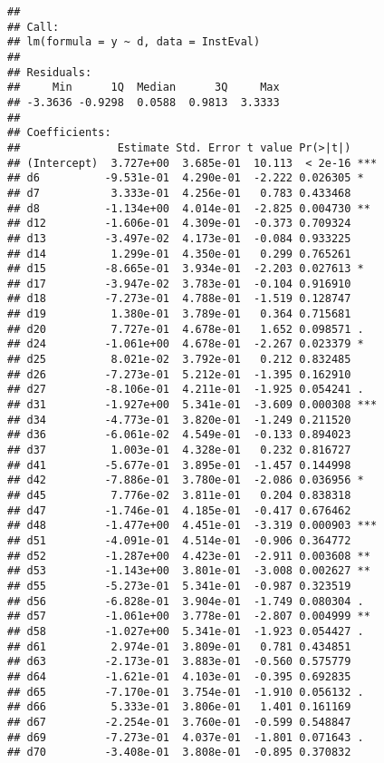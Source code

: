 \documentclass[
]{article}
\begin{document}
\begin{verbatim}
## 
## Call:
## lm(formula = y ~ d, data = InstEval)
## 
## Residuals:
##     Min      1Q  Median      3Q     Max 
## -3.3636 -0.9298  0.0588  0.9813  3.3333 
## 
## Coefficients:
##               Estimate Std. Error t value Pr(>|t|)    
## (Intercept)  3.727e+00  3.685e-01  10.113  < 2e-16 ***
## d6          -9.531e-01  4.290e-01  -2.222 0.026305 *  
## d7           3.333e-01  4.256e-01   0.783 0.433468    
## d8          -1.134e+00  4.014e-01  -2.825 0.004730 ** 
## d12         -1.606e-01  4.309e-01  -0.373 0.709324    
## d13         -3.497e-02  4.173e-01  -0.084 0.933225    
## d14          1.299e-01  4.350e-01   0.299 0.765261    
## d15         -8.665e-01  3.934e-01  -2.203 0.027613 *  
## d17         -3.947e-02  3.783e-01  -0.104 0.916910    
## d18         -7.273e-01  4.788e-01  -1.519 0.128747    
## d19          1.380e-01  3.789e-01   0.364 0.715681    
## d20          7.727e-01  4.678e-01   1.652 0.098571 .  
## d24         -1.061e+00  4.678e-01  -2.267 0.023379 *  
## d25          8.021e-02  3.792e-01   0.212 0.832485    
## d26         -7.273e-01  5.212e-01  -1.395 0.162910    
## d27         -8.106e-01  4.211e-01  -1.925 0.054241 .  
## d31         -1.927e+00  5.341e-01  -3.609 0.000308 ***
## d34         -4.773e-01  3.820e-01  -1.249 0.211520    
## d36         -6.061e-02  4.549e-01  -0.133 0.894023    
## d37          1.003e-01  4.328e-01   0.232 0.816727    
## d41         -5.677e-01  3.895e-01  -1.457 0.144998    
## d42         -7.886e-01  3.780e-01  -2.086 0.036956 *  
## d45          7.776e-02  3.811e-01   0.204 0.838318    
## d47         -1.746e-01  4.185e-01  -0.417 0.676462    
## d48         -1.477e+00  4.451e-01  -3.319 0.000903 ***
## d51         -4.091e-01  4.514e-01  -0.906 0.364772    
## d52         -1.287e+00  4.423e-01  -2.911 0.003608 ** 
## d53         -1.143e+00  3.801e-01  -3.008 0.002627 ** 
## d55         -5.273e-01  5.341e-01  -0.987 0.323519    
## d56         -6.828e-01  3.904e-01  -1.749 0.080304 .  
## d57         -1.061e+00  3.778e-01  -2.807 0.004999 ** 
## d58         -1.027e+00  5.341e-01  -1.923 0.054427 .  
## d61          2.974e-01  3.809e-01   0.781 0.434851    
## d63         -2.173e-01  3.883e-01  -0.560 0.575779    
## d64         -1.621e-01  4.103e-01  -0.395 0.692835    
## d65         -7.170e-01  3.754e-01  -1.910 0.056132 .  
## d66          5.333e-01  3.806e-01   1.401 0.161169    
## d67         -2.254e-01  3.760e-01  -0.599 0.548847    
## d69         -7.273e-01  4.037e-01  -1.801 0.071643 .  
## d70         -3.408e-01  3.808e-01  -0.895 0.370832    

\end{verbatim}
\end{document}
